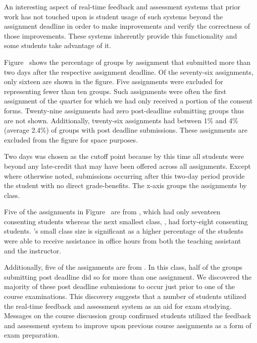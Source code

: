 An interesting aspect of real-time feedback and assessment systems that prior
work has not touched upon is student usage of such systems beyond the
assignment deadline in order to make improvements and verify the correctness of
those improvements. These systems inherently provide this functionality and
some students take advantage of it.

Figure~ shows the percentage of groups by assignment that
submitted more than two days after the respective assignment deadline. Of the
seventy-six assignments, only sixteen are shown in the figure. Five assignments
were excluded for representing fewer than ten groups. Such assignments were
often the first assignment of the quarter for which we had only received a
portion of the consent forms. Twenty-nine assignments had zero post-deadline
submitting groups thus are not shown. Additionally, twenty-six assignments had
between 1\% and 4\% (average 2.4\%) of groups with post deadline
submissions. These assignments are excluded from the figure for space purposes.

Two days was chosen as the cutoff point because by this time all students were
beyond any late-credit that may have been offered across all
assignments. Except where otherwise noted, submissions occurring after this
two-day period provide the student with no direct grade-benefits. The x-axis
groups the assignments by class.

Five of the assignments in Figure~ are from ,
which had only seventeen consenting students whereas the next smallest class,
, had forty-eight consenting students. 's small class
size is significant as a higher percentage of the students were able to receive
assistance in office hours from both the teaching assistant and the instructor.

Additionally, five of the assignments are from . In this class, half
of the groups submitting post deadline did so for more than one assignment. We
discovered the majority of these post deadline submissions to occur just prior
to one of the course examinations. This discovery suggests that a number of
students utilized the real-time feedback and assessment system as an aid for
exam studying. Messages on the course discussion group confirmed students
utilized the feedback and assessment system to improve upon previous course
assignments as a form of exam preparation.

